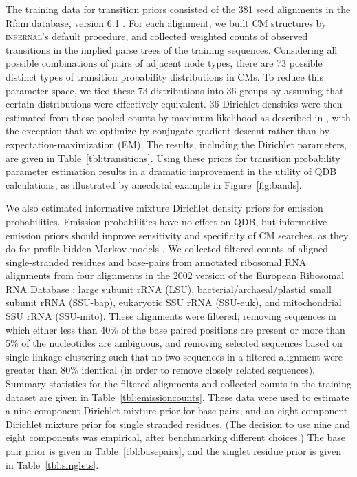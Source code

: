 \documentclass[11pt]{article}
\newif\ifdraft
\begin{document}
The training data for transition priors consisted of the 381 seed
alignments in the Rfam database, version 6.1
\cite{Griffiths-Jones05}. For each alignment, we built CM structures
by \textsc{infernal}'s default procedure, and collected weighted
counts of observed transitions in the implied parse trees of the
training sequences. Considering all possible combinations of pairs of
adjacent node types, there are 73 possible distinct types of
transition probability distributions in CMs. To reduce this parameter
space, we tied these 73 distributions into 36 groups by assuming that
certain distributions were effectively equivalent.  36 Dirichlet
densities were then estimated from these pooled counts by maximum
likelihood as described in \cite{Sjolander96}, with the exception that
we optimize by conjugate gradient descent \cite{Press93} rather than
by expectation-maximization (EM).  The results, including the
Dirichlet parameters, are given in Table~\ref{tbl:transitions}.  Using
these priors for transition probability parameter estimation results
in a dramatic improvement in the utility of QDB calculations, as
illustrated by anecdotal example in Figure~\ref{fig:bands}.

\ifdraft

\fi

We also estimated informative mixture Dirichlet density priors for
emission probabilities.  Emission probabilities have no effect on QDB,
but informative emission priors should improve sensitivity and
specificity of CM searches, as they do for profile hidden Markov
models \cite{BrownM93,Sjolander96}. We collected filtered counts of
aligned single-stranded residues and base-pairs from annotated
ribosomal RNA alignments from four alignments in the 2002 version of
the European Ribosomal RNA Database \cite{Wuyts01, Wuyts02}: large
subunit rRNA (LSU), bacterial/archaeal/plastid small subunit rRNA
(SSU-bap), eukaryotic SSU rRNA (SSU-euk), and mitochondrial SSU rRNA
(SSU-mito). These alignments were filtered, removing sequences in
which either less than 40\% of the base paired positions are present
or more than 5\% of the nucleotides are ambiguous, and removing
selected sequences based on single-linkage-clustering such that no two
sequences in a filtered alignment were greater than 80\% identical (in
order to remove closely related sequences). Summary statistics for the
filtered alignments and collected counts in the training dataset are
given in Table~\ref{tbl:emissioncounts}. These data were used to
estimate a nine-component Dirichlet mixture prior for base pairs, and
an eight-component Dirichlet mixture prior for single stranded
residues. (The decision to use nine and eight components was
empirical, after benchmarking different choices.) The base pair prior
is given in Table~\ref{tbl:basepairs}, and the singlet residue prior
is given in Table~\ref{tbl:singlets}.
\end{document}

